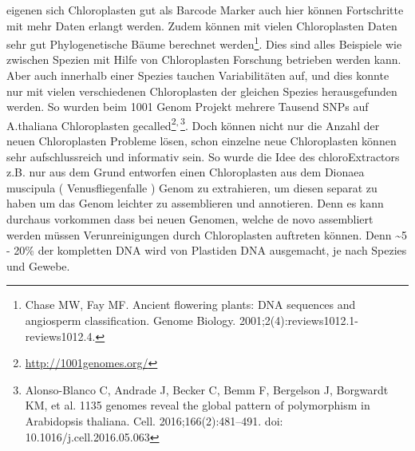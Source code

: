 \documentclass{scrartcl}
\begin{document}
eigenen sich Chloroplasten gut als Barcode Marker auch hier können Fortschritte mit mehr Daten erlangt werden. Zudem können mit vielen Chloroplasten Daten sehr gut Phylogenetische Bäume berechnet werden\footnote{Chase MW, Fay MF. Ancient flowering plants: DNA sequences and angiosperm classification. Genome Biology. 2001;2(4):reviews1012.1-reviews1012.4.}.
Dies sind alles Beispiele wie zwischen Spezien mit Hilfe von Chloroplasten Forschung betrieben werden kann. Aber auch innerhalb einer Spezies tauchen Variabilitäten auf, und dies konnte nur mit vielen verschiedenen
Chloroplasten der gleichen Spezies herausgefunden werden. So wurden beim 1001 Genom Projekt mehrere Tausend SNPs auf A.thaliana Chloroplasten gecalled\footnote{\url{http://1001genomes.org/}}\textsuperscript{,}\,\footnote{Alonso-Blanco C, Andrade J, Becker C, Bemm F, Bergelson J, Borgwardt KM, et al. 1135 genomes reveal the global pattern of polymorphism in Arabidopsis thaliana. Cell. 2016;166(2):481–491. doi: 10.1016/j.cell.2016.05.063}. 
Doch können nicht nur die Anzahl der neuen Chloroplasten Probleme lösen, schon einzelne neue Chloroplasten können sehr aufschlussreich und informativ sein. So wurde die Idee des chloroExtractors z.B. nur aus dem Grund
entworfen einen Chloroplasten aus dem Dionaea muscipula ( Venusfliegenfalle ) Genom zu extrahieren, um diesen separat zu haben um das Genom leichter zu assemblieren und annotieren. Denn es kann durchaus vorkommen
dass bei neuen Genomen, welche de novo assembliert werden müssen Verunreinigungen durch Chloroplasten auftreten können. Denn \textasciitilde{}5 - 20\% der kompletten DNA wird von Plastiden DNA ausgemacht, je nach Spezies und Gewebe\footnotemark[27]{}.
\end{document}

